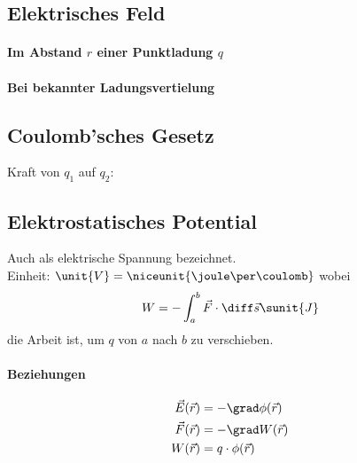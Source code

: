 	\subsection{Elektrisches Feld} %
		\paragraph{Im Abstand $r$ einer Punktladung $q$} %
		\paragraph{Bei bekannter Ladungsvertielung} %
	\subsection{Coulomb'sches Gesetz} %
		Kraft von $q_1$ auf $q_2$:
	\subsection{Elektrostatisches Potential} %
		Auch als elektrische Spannung bezeichnet.\\Einheit: $\unit{V} = \niceunit{\joule\per\coulomb}$
		wobei
		\begin{equation*}
			W = - \int_a^b \vec F \cdot \diff \vec s \sunit{J}
		\end{equation*}
		die Arbeit ist, um $q$ von $a$ nach $b$ zu verschieben.
		
		\paragraph{Beziehungen} %
			\begin{align*}
				\vec E (\vec r) &= - \grad \phi(\vec r) \\
				\vec F (\vec r) &= - \grad W(\vec r) \\
				W(\vec r) &= q \cdot \phi(\vec r)
			\end{align*}
		
